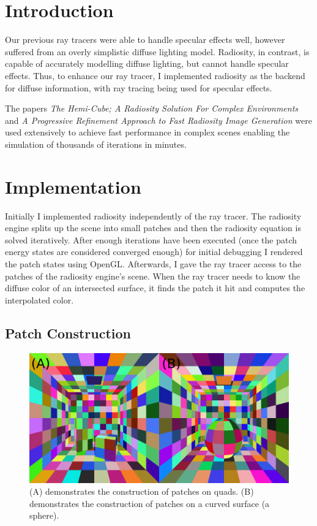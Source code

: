 \documentclass[sigconf]{acmart}
\begin{document}
\section{Introduction}

Our previous ray tracers were able to handle specular effects well, however suffered from an overly simplistic diffuse lighting model. Radiosity, in contrast, is capable of accurately modelling diffuse lighting, but cannot handle specular effects. Thus, to enhance our ray tracer, I implemented radiosity as the backend for diffuse information, with ray tracing being used for specular effects.

The papers \textit{The Hemi-Cube; A Radiosity Solution For Complex Environments} \cite{hemicube} and \textit{A Progressive Refinement Approach to Fast Radiosity Image Generation} \cite{progref} were used extensively to achieve fast performance in complex scenes enabling the simulation of thousands of iterations in minutes.

\section{Implementation}

Initially I implemented radiosity independently of the ray tracer. The radiosity engine splits up the scene into small patches and then the radiosity equation is solved iteratively. After enough iterations have been executed (once the patch energy states are considered converged enough) for initial debugging I rendered the patch states using OpenGL. Afterwards, I gave the ray tracer access to the patches of the radiosity engine's scene. When the ray tracer needs to know the diffuse color of an intersected surface, it finds the patch it hit and computes the interpolated color.

\subsection{Patch Construction}

\begin{figure}[t]
    \includegraphics[width=\linewidth]{reportfiles/patches}
    \caption{(A) demonstrates the construction of patches on quads. (B) demonstrates the construction of patches on a curved surface (a sphere).}
    \label{fig:patches}
\end{figure}
\end{document}
